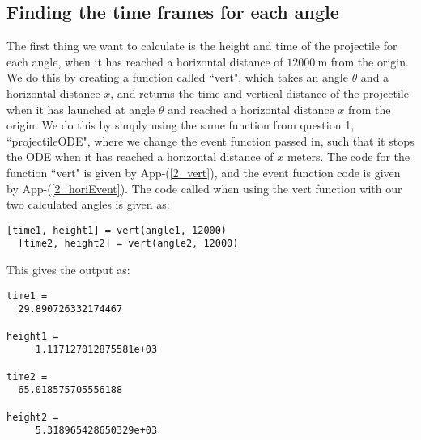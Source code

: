 \documentclass[12pt]{article}
\let\oldref\ref
\renewcommand{\ref}[1]{(\oldref{#1})}
\newcommand{\apref}[1]{App-\ref{#1}}
\begin{document}
\subsection{Finding the time frames for each angle}
The first thing we want to calculate is the height and time of the projectile for each angle, when it has reached a horizontal distance of $\SI{12000}{\meter}$ from the origin. We do this by creating a function called ``vert", which takes an angle $\theta$ and a horizontal distance $x$, and returns the time and vertical distance of the projectile when it has launched at angle $\theta$ and reached a horizontal distance $x$ from the origin. We do this by simply using the same function from question 1, ``projectileODE", where we change the event function passed in, such that it stops the ODE when it has reached a horizontal distance of $x$ meters. The code for the function ``vert" is given by \apref{2_vert}, and the event function code is given by \apref{2_horiEvent}. The code called when using the vert function with our two calculated angles is given as:
\begin{lstlisting}[title={Using vert with the two angles}]
  [time1, height1] = vert(angle1, 12000)
  [time2, height2] = vert(angle2, 12000)
\end{lstlisting}
This gives the output as:
\begin{lstlisting}[title={Output of vert}]
time1 =
  29.890726332174467

height1 =
     1.117127012875581e+03

time2 =
  65.018575705556188

height2 =
     5.318965428650329e+03
\end{lstlisting}
\end{document}
